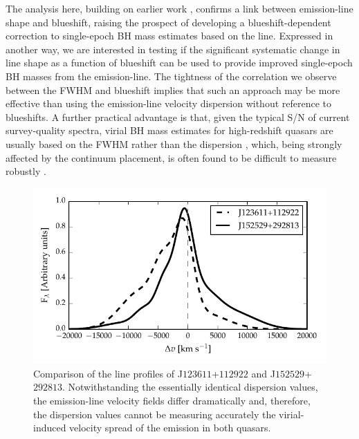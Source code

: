 The analysis here, building on earlier work \citep[including][]{sulentic07,shen12}, confirms a link between  emission-line shape and blueshift, raising the prospect of developing a blueshift-dependent correction to single-epoch BH mass estimates based on the  line. 
Expressed in another way, we are interested in testing if the significant systematic change in line shape as a function of  blueshift can be used to provide improved single-epoch BH masses from the  emission-line.  
The tightness of the correlation we observe between the  FWHM and blueshift implies that such an approach may be more effective than using the  emission-line velocity dispersion without reference to blueshifts.
A further practical advantage is that, given the typical S/N of current survey-quality spectra, virial BH mass estimates for high-redshift quasars are usually based on the FWHM rather than the dispersion \citep[e.g.][]{shen11}, which, being strongly affected by the continuum placement, is often found to be difficult to measure robustly \citep[e.g.][]{mejia-restrepo16}. 

\begin{figure}
    \centering
    \includegraphics[width=\linewidth]{figures/chapter03/civ_comparison.pdf} 
    \caption[{Comparison of the  line profiles of J$123611$+$112922$ and J$152529$+$292813$.}]{Comparison of the  line profiles of J$123611$+$112922$ and J$152529$+$292813$. Notwithstanding the essentially identical dispersion values, the emission-line velocity fields differ dramatically and, therefore, the dispersion values cannot be measuring accurately the virial-induced velocity spread of the  emission in both quasars. }
    \label{fig:civ_comparison}
\end{figure}


